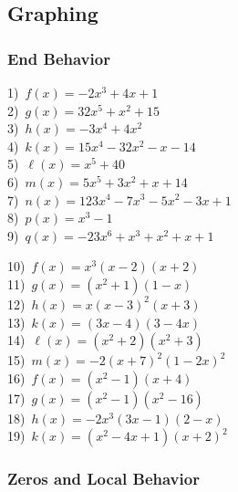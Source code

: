\newpage

\subsection{Graphing}
\subsubsection{End Behavior}

{\pp

  1)~$f(x)=-2x^3 + 4x+1$\\
	2)~$g(x)=32x^5+x^2+15$\\
	3)~$h(x)=-3x^4+4x^2$\\
	4)~$k(x)=15x^4-32x^2-x-14$\\
  5)~$\ell(x)=x^5+40$\\
  6)~$m(x)=5x^5+3x^2+x+14$\\
  7)~$n(x)=123x^4-7x^3-5x^2-3x+1$\\
	8)~$p(x)=x^3-1$\\
  9)~$q(x)=-23x^6+x^3+x^2+x+1$\\
 
{\pp
\label{Mults}
  10)~$f(x)=x^3(x-2)(x+2)$\\
	11)~$g(x)=(x^2+1)(1-x)$\\
	12)~$h(x)=x(x-3)^2(x+3)$\\
	13)~$k(x)=(3x-4)(3-4x)$\\
  14)~$\ell(x)=(x^2+2)(x^2+3)$\\
  15)~$m(x)=-2(x+7)^2(1-2x)^2$\\
  16)~$f(x)=(x^2-1)(x+4)$\\
	17)~$g(x)=(x^2-1)(x^2-16)$\\
	18)~$h(x)=-2x^3(3x-1)(2-x)$\\
	19)~$k(x)=(x^2-4x+1)(x+2)^2$\\

\subsubsection{Zeros and Local Behavior}

}}
